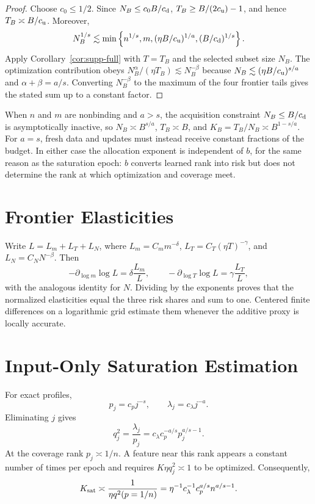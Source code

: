 \documentclass[letterpaper]{article}
\newcommand{\1}{\mathbf 1}
\begin{document}
\begin{proof}
Choose $c_0\le1/2$. Since $N_B\le c_0B/c_{\rm d}$,
$T_B\ge B/(2c_{\rm u})-1$, and hence $T_B\asymp B/c_{\rm u}$. Moreover,
\[
N_B^{1/s}\lesssim
\min\left\{n^{1/s},m,(\eta B/c_{\rm u})^{1/a},
(B/c_{\rm d})^{1/s}\right\}.
\]
Apply Corollary~\ref{cor:supp-full} with $T=T_B$ and the selected subset size
$N_B$. The optimization contribution obeys
$N_B^\alpha/(\eta T_B)\lesssim N_B^{-\beta}$ because
$N_B\lesssim(\eta B/c_{\rm u})^{s/a}$ and
$\alpha+\beta=a/s$. Converting $N_B^{-\beta}$ to the maximum of the four
frontier tails gives the stated sum up to a constant factor.
\end{proof}

When $n$ and $m$ are nonbinding and $a>s$, the acquisition constraint
$N_B\le B/c_{\rm d}$ is asymptotically inactive, so
$N_B\asymp B^{s/a}$, $T_B\asymp B$, and
$K_B=T_B/N_B\asymp B^{1-s/a}$. For $a=s$, fresh data and updates must instead
receive constant fractions of the budget. In either case the allocation
exponent is independent of $b$, for the same reason as the saturation epoch:
$b$ converts learned rank into risk but does not determine the rank at which
optimization and coverage meet.

\section{Frontier Elasticities}

Write $L=L_m+L_T+L_N$, where
$L_m=C_m m^{-\delta}$, $L_T=C_T(\eta T)^{-\gamma}$, and
$L_N=C_NN^{-\beta}$. Then
\[
-\partial_{\log m}\log L=\delta\frac{L_m}{L},\qquad
-\partial_{\log T}\log L=\gamma\frac{L_T}{L},
\]
with the analogous identity for $N$. Dividing by the exponents proves that the
normalized elasticities equal the three risk shares and sum to one. Centered
finite differences on a logarithmic grid estimate them whenever the additive
proxy is locally accurate.

\section{Input-Only Saturation Estimation}

For exact profiles,
\[
p_j=c_pj^{-s},
\qquad
\lambda_j=c_\lambda j^{-a}.
\]
Eliminating $j$ gives
\begin{equation}
q_j^2=\frac{\lambda_j}{p_j}
=c_\lambda c_p^{-a/s}p_j^{a/s-1}.
\label{eq:supp-q-p}
\end{equation}
At the coverage rank $p_j\asymp1/n$. A feature near this rank appears a
constant number of times per epoch and requires $K\eta q_j^2\asymp1$ to be
optimized. Consequently,
\[
K_{\rm sat}\asymp
\frac{1}{\eta q^2(p=1/n)}
=\eta^{-1}c_\lambda^{-1}c_p^{a/s}n^{a/s-1}.
\]
\end{document}
